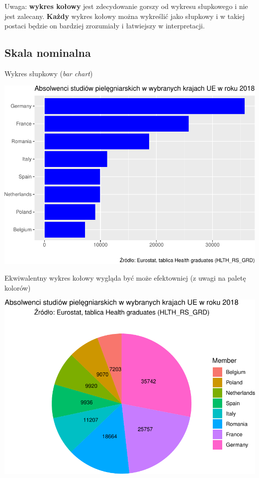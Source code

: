 \documentclass[
  openany]{book}
\begin{document}
Uwaga: \textbf{wykres kołowy} jest
zdecydowanie gorszy od wykresu słupkowego i nie jest zalecany.
\textbf{Każdy} wykres kołowy można wykreślić jako słupkowy i w takiej postaci
będzie on bardziej zrozumiały i łatwiejszy w interpretacji.

\hypertarget{skala-nominalna}{%
\subsection{Skala nominalna}\label{skala-nominalna}}

Wykres słupkowy (\emph{bar chart})

\includegraphics{_main_files/figure-latex/unnamed-chunk-6-1.pdf}

Ekwiwalentny wykres kołowy wygląda być może efektowniej (z uwagi na paletę kolorów)

\includegraphics{_main_files/figure-latex/unnamed-chunk-7-1.pdf}
\end{document}
